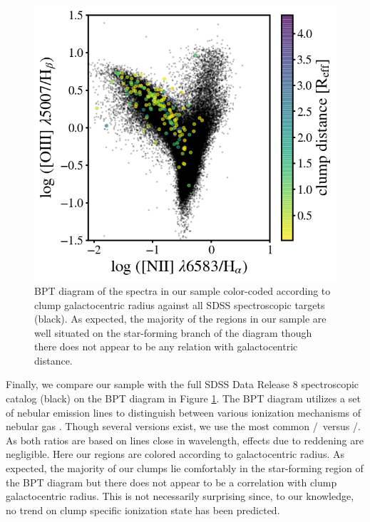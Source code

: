 \begin{figure}
\includegraphics[width=\textwidth]{Figures/bpt2.png}
\caption[BPT diagram of spectra in this sample compared to all SDSS spectroscopic targets.]{BPT diagram of the spectra in our sample color-coded according to clump galactocentric radius against all SDSS spectroscopic targets (black). As expected, the majority of the regions in our sample are well situated on the star-forming branch of the diagram though there does not appear to be any relation with galactocentric distance.}
\label{fig: bpt}
\end{figure}

Finally, we compare our sample with the full SDSS Data Release 8 spectroscopic catalog (black) on the BPT diagram in Figure \ref{fig: bpt}. The BPT diagram utilizes a set of nebular emission lines to distinguish between various ionization mechanisms of nebular gas \citep{Baldwin1981}. Though several versions exist, we use the most common \oiii/\ha~versus \nii/\hb. As both ratios are based on lines close in wavelength, effects due to reddening are negligible. Here our regions are colored according to galactocentric radius. As expected, the majority of our clumps lie comfortably in the star-forming region of the BPT diagram but there does not appear to be a correlation with clump galactocentric radius. This is not necessarily surprising since, to our knowledge, no trend on clump specific ionization state has been predicted. 



